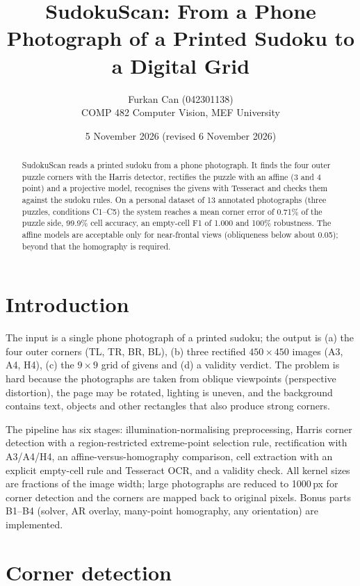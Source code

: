 \documentclass[conference]{IEEEtran}%
\title{SudokuScan: From a Phone Photograph of a Printed Sudoku to a Digital Grid}
\author{Furkan Can (042301138)\\COMP 482 Computer Vision, MEF University}
\date{5 November 2026 (revised 6 November 2026)}
\begin{document}
\maketitle

\begin{abstract}
SudokuScan reads a printed sudoku from a phone photograph. It finds the four
outer puzzle corners with the Harris detector, rectifies the puzzle with an
affine (3 and 4 point) and a projective model, recognises the givens with
Tesseract and checks them against the sudoku rules. On a personal dataset of 13
annotated photographs (three puzzles, conditions C1--C5) the system reaches a
mean corner error of 0.71\% of the puzzle side, 99.9\% cell accuracy, an
empty-cell F1 of 1.000 and 100\% robustness. The affine models are acceptable
only for near-frontal views (obliqueness below about 0.05); beyond that the
homography is required.
\end{abstract}

\section{Introduction}
The input is a single phone photograph of a printed sudoku; the output is
(a) the four outer corners (TL, TR, BR, BL), (b) three rectified
$450\times450$ images (A3, A4, H4), (c) the $9\times9$ grid of givens and
(d) a validity verdict. The problem is hard because the photographs are taken
from oblique viewpoints (perspective distortion), the page may be rotated,
lighting is uneven, and the background contains text, objects and other
rectangles that also produce strong corners.

The pipeline has six stages: illumination-normalising preprocessing, Harris
corner detection with a region-restricted extreme-point selection rule,
rectification with A3/A4/H4, an affine-versus-homography comparison,
cell extraction with an explicit empty-cell rule and Tesseract OCR, and a
validity check. All kernel sizes are fractions of the image width; large
photographs are reduced to 1000\,px for corner detection and the corners are
mapped back to original pixels. Bonus parts B1--B4 (solver, AR overlay,
many-point homography, any orientation) are implemented.

\section{Corner detection}
\end{document}

